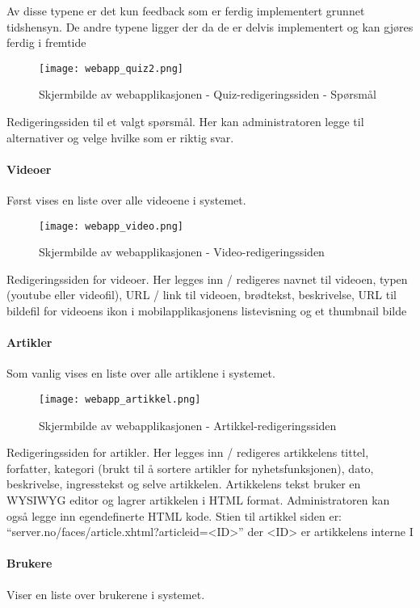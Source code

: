 \documentclass[../main.tex]{subfiles}
\begin{document}
Av disse typene er det kun feedback som er ferdig implementert grunnet tidshensyn. De andre typene ligger der da de er delvis implementert og kan gjøres ferdig i fremtide

\begin{figure}[H]
  \centering
  \texttt{[image: webapp\_quiz2.png]}
  \caption{Skjermbilde av webapplikasjonen - Quiz-redigeringssiden - Spørsmål}
\end{figure}

Redigeringssiden til et valgt spørsmål. Her kan administratoren legge til alternativer og velge hvilke som er riktig svar.


\paragraph{Videoer}
Først vises en liste over alle videoene i systemet.

\begin{figure}[H]
  \centering
  \texttt{[image: webapp\_video.png]}
  \caption{Skjermbilde av webapplikasjonen - Video-redigeringssiden}
\end{figure}

Redigeringssiden for videoer. Her legges inn / redigeres navnet til videoen, typen (youtube eller videofil), URL / link til videoen, brødtekst, beskrivelse, URL til bildefil for videoens ikon i mobilapplikasjonens listevisning og et thumbnail bilde


\paragraph{Artikler}
Som vanlig vises en liste over alle artiklene i systemet.

\begin{figure}[H]
  \centering
  \texttt{[image: webapp\_artikkel.png]}
  \caption{Skjermbilde av webapplikasjonen - Artikkel-redigeringssiden}
\end{figure}

Redigeringssiden for artikler. Her legges inn / redigeres artikkelens tittel, forfatter, kategori (brukt til å sortere artikler for nyhetsfunksjonen), dato, beskrivelse, ingresstekst og selve artikkelen. Artikkelens tekst bruker en WYSIWYG editor og lagrer artikkelen i HTML format. Administratoren kan også legge inn egendefinerte HTML kode. Stien til artikkel siden er: “server.no/faces/article.xhtml?articleid=<ID>” der <ID> er artikkelens interne I


\paragraph{Brukere}
Viser en liste over brukerene i systemet.
\end{document}
